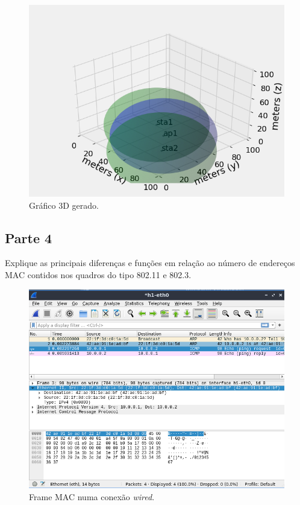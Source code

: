 \documentclass{article}
\begin{document}
\begin{figure}[!htb]
\centering
\includegraphics[width=0.6\columnwidth]{images/p3_3d.png}
\caption{Gráfico 3D gerado.}
\end{figure}

\FloatBarrier

\subsection{Parte 4}

\begin{tcolorbox}
    Explique as principais diferenças e funções em relação ao número de endereços MAC contidos nos quadros do tipo 802.11 e 802.3.
\end{tcolorbox}

\begin{figure}[!htb]
\centering
\includegraphics[width=0.8\columnwidth]{images/p4_wired.png}
\caption{Frame MAC numa conexão \textit{wired}.}
\label{fig:p4_wired}
\end{figure}
\end{document}
